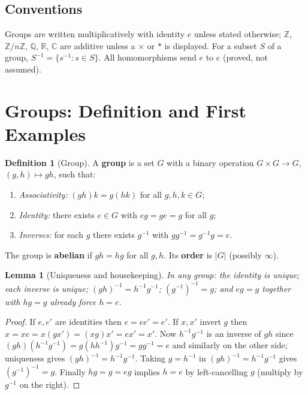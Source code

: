 \documentclass[11pt,a4paper]{article}
\newtheorem{lemma}[theorem]{Lemma}
\theoremstyle{definition}
\newtheorem{definition}[theorem]{Definition}
\newcommand{\Z}{\mathbb{Z}}
\newcommand{\Q}{\mathbb{Q}}
\newcommand{\R}{\mathbb{R}}
\newcommand{\C}{\mathbb{C}}
\begin{document}
	\subsection*{Conventions}
	Groups are written multiplicatively with identity $e$ unless stated otherwise; $\Z$, $\Z/n\Z$,
	$\Q$, $\R$, $\C$ are additive unless a $\times$ or $*$ is displayed. For a subset $S$ of a group,
	$S^{-1}=\{s^{-1}:s\in S\}$. All homomorphisms send $e$ to $e$ (proved, not assumed).
	
	\tableofcontents
	\newpage
	
	\section{Groups: Definition and First Examples}
	
	\begin{definition}[Group]
		A \textbf{group} is a set $G$ with a binary operation $G\times G\to G$, $(g,h)\mapsto gh$, such that:
		\begin{enumerate}[label=(G\arabic*)]
			\item \emph{Associativity:} $(gh)k=g(hk)$ for all $g,h,k\in G$;
			\item \emph{Identity:} there exists $e\in G$ with $eg=ge=g$ for all $g$;
			\item \emph{Inverses:} for each $g$ there exists $g^{-1}$ with $gg^{-1}=g^{-1}g=e$.
		\end{enumerate}
		The group is \textbf{abelian} if $gh=hg$ for all $g,h$. Its \textbf{order} is $|G|$ (possibly $\infty$).
	\end{definition}
	
	\begin{lemma}[Uniqueness and housekeeping]\label{lem:basics}
		In any group: the identity is unique; each inverse is unique; $(gh)^{-1}=h^{-1}g^{-1}$;
		$(g^{-1})^{-1}=g$; and $eg=g$ together with $hg=g$ already force $h=e$.
	\end{lemma}
	\begin{proof}
		If $e,e'$ are identities then $e=ee'=e'$. If $x,x'$ invert $g$ then
		$x=xe=x(gx')=(xg)x'=ex'=x'$. Now $h^{-1}g^{-1}$ is an inverse of $gh$ since
		$(gh)(h^{-1}g^{-1})=g(hh^{-1})g^{-1}=gg^{-1}=e$ and similarly on the other side; uniqueness gives
		$(gh)^{-1}=h^{-1}g^{-1}$. Taking $g=h^{-1}$ in $(gh)^{-1}=h^{-1}g^{-1}$ gives $(g^{-1})^{-1}=g$.
		Finally $hg=g=eg$ implies $h=e$ by left-cancelling $g$ (multiply by $g^{-1}$ on the right).
	\end{proof}
	
\end{document}

